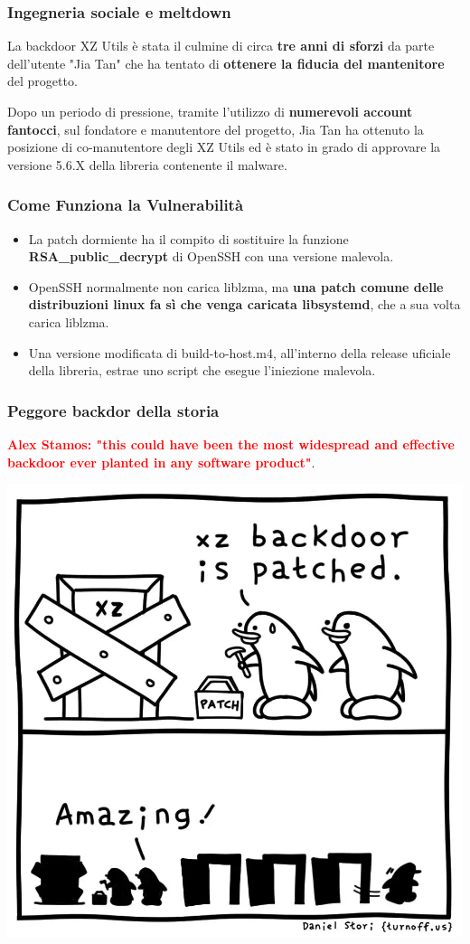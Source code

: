 \begin{frame}
\frametitle{Ingegneria sociale e meltdown}
La backdoor XZ Utils è stata il culmine di circa \textbf{tre anni di sforzi} da parte dell'utente "Jia Tan" che ha tentato di \textbf{ottenere la fiducia del mantenitore} del progetto.

\vspace{0.5 cm}

Dopo un periodo di pressione, tramite l'utilizzo di \textbf{numerevoli account fantocci}, sul fondatore e manutentore del progetto, Jia Tan ha ottenuto la posizione di co-manutentore degli XZ Utils ed è stato in grado di approvare la versione 5.6.X della libreria contenente il malware.

\end{frame}

\begin{frame}
    \frametitle{Come Funziona la Vulnerabilità}
    \begin{itemize}
        \item La patch dormiente ha il compito di sostituire la funzione \textbf{RSA\_public\_decrypt} di OpenSSH con una versione malevola.
        \item OpenSSH normalmente non carica liblzma, ma \textbf{una patch comune delle distribuzioni linux fa sì che venga caricata libsystemd}, che a sua volta carica liblzma.
        \item Una versione modificata di build-to-host.m4, all'interno della release uficiale della libreria, estrae uno script che esegue l'iniezione malevola.
    \end{itemize}
\end{frame}

\begin{frame}
    \frametitle{Peggore backdor della storia}
    \textbf{\textcolor{red}{Alex Stamos: "this could have been the most widespread and effective backdoor ever planted in any software product"}}.

    \begin{center}
        \includegraphics[width=0.4\linewidth]{img/2-Introduction/xz-backdoor-patched.jpeg}
    \end{center}
\vspace{0.5 cm}

\end{frame}